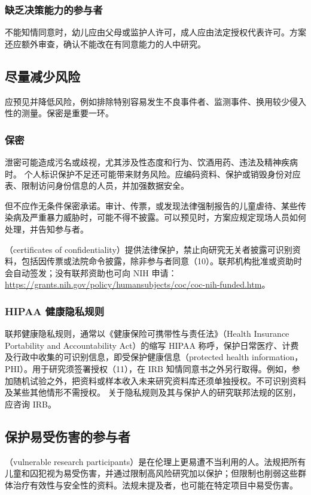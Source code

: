 \subsubsection{缺乏决策能力的参与者}
不能知情同意时，幼儿应由父母或监护人许可，成人应由法定授权代表许可。方案还应额外审查，确认不能改在有同意能力的人中研究。

\subsection{尽量减少风险}
应预见并降低风险，例如排除特别容易发生不良事件者、监测事件、换用较少侵入性的测量。保密是重要一环。
\subsubsection{保密}
泄密可能造成污名或歧视，尤其涉及性态度和行为、饮酒用药、违法及精神疾病时。
个人标识保护不足还可能带来财务风险。应编码资料、保护或销毁身份对应表、限制访问身份信息的人员，并加强数据安全。

但不应作无条件保密承诺。审计、传票，或发现法律强制报告的儿童虐待、某些传染病及严重暴力威胁时，可能不得不披露。可以预见时，方案应规定现场人员如何处理，并告知参与者。

（certificates of confidentiality）提供法律保护，禁止向研究无关者披露可识别资料，包括因传票或法院命令披露，除非参与者同意（10）。联邦机构批准或资助时会自动签发；没有联邦资助也可向 NIH 申请：\url{https://grants.nih.gov/policy/humansubjects/coc/coc-nih-funded.htm}。

\subsubsection{HIPAA 健康隐私规则}
联邦健康隐私规则，通常以《健康保险可携带性与责任法》（Health Insurance Portability and Accountability Act）的缩写 HIPAA 称呼，保护日常医疗、计费及行政中收集的可识别信息，即受保护健康信息（protected health information，PHI）。用于研究须签署授权（11），在 IRB 知情同意书之外另行取得。例如，参加随机试验之外，把资料或样本收入未来研究资料库还须单独授权。不可识别资料及某些其他情形不需授权。
关于隐私规则及其与保护人的研究联邦法规的区别，应咨询 IRB。

\subsection{保护易受伤害的参与者}
（vulnerable research participants）是在伦理上更易遭不当利用的人。法规把所有儿童和囚犯视为易受伤害，并通过限制高风险研究加以保护；但限制也削弱这些群体治疗有效性与安全性的资料。法规未提及者，也可能在特定项目中易受伤害。

